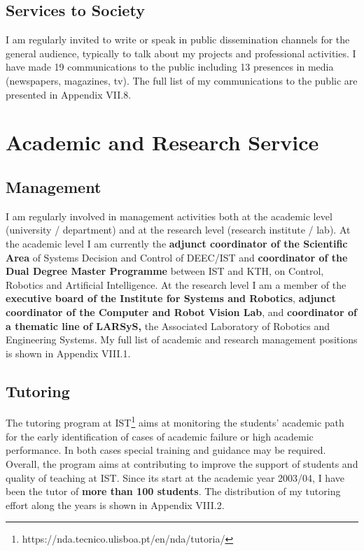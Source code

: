 \documentclass[
]{article}
\begin{document}
\subsection{Services to Society}\label{services-to-society}

I am regularly invited to write or speak in public dissemination
channels for the general audience, typically to talk about my projects
and professional activities. I have made 19 communications to the public
including 13 presences in media (newspapers, magazines, tv). The full
list of my communications to the public are presented in Appendix VII.8.

\section{Academic and Research
Service}\label{academic-and-research-service}

\subsection{\texorpdfstring{Management }{Management }}\label{management}

I am regularly involved in management activities both at the academic
level (university / department) and at the research level (research
institute / lab). At the academic level I am currently the
\textbf{adjunct coordinator of the Scientific Area} of Systems Decision
and Control of DEEC/IST and \textbf{coordinator of the Dual Degree
Master Programme} between IST and KTH, on Control, Robotics and
Artificial Intelligence. At the research level I am a member of the
\textbf{executive board of the Institute for Systems and Robotics},
\textbf{adjunct coordinator of the Computer and Robot Vision Lab}, and
\textbf{coordinator of a thematic line of LARSyS,} the Associated
Laboratory of Robotics and Engineering Systems. My full list of academic
and research management positions is shown in Appendix VIII.1.

\subsection{Tutoring}\label{tutoring}

The tutoring program at IST\footnote{https://nda.tecnico.ulisboa.pt/en/nda/tutoria/}
aims at monitoring the students' academic path for the early
identification of cases of academic failure or high academic
performance. In both cases special training and guidance may be
required. Overall, the program aims at contributing to improve the
support of students and quality of teaching at IST. Since its start at
the academic year 2003/04, I have been the tutor of \textbf{more than
100 students}. The distribution of my tutoring effort along the years is
shown in Appendix VIII.2.
\end{document}
